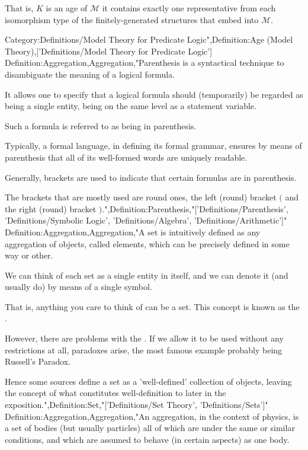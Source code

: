 That is, $K$ is an age of $\mathcal M$  it contains exactly one representative from each isomorphism type of the finitely-generated structures that embed into $\mathcal M$.



Category:Definitions/Model Theory for Predicate Logic",Definition:Age (Model Theory),['Definitions/Model Theory for Predicate Logic']
Definition:Aggregation,Aggregation,"Parenthesis is a syntactical technique to disambiguate the meaning of a logical formula.

It allows one to specify that a logical formula should (temporarily) be regarded as being a single entity, being on the same level as a statement variable.

Such a formula is referred to as being in parenthesis.

Typically, a formal language, in defining its formal grammar, ensures by means of parenthesis that all of its well-formed words are uniquely readable.


Generally, brackets are used to indicate that certain formulas are in parenthesis.

The brackets that are mostly used are round ones, the left (round) bracket $($ and the right (round) bracket $)$.",Definition:Parenthesis,"['Definitions/Parenthesis', 'Definitions/Symbolic Logic', 'Definitions/Algebra', 'Definitions/Arithmetic']"
Definition:Aggregation,Aggregation,"A set is intuitively defined as any aggregation of objects, called elements, which can be precisely defined in some way or other.

We can think of each set as a single entity in itself, and we can denote it (and usually do) by means of a single symbol.


That is, anything you care to think of can be a set. This concept is known as the .


However, there are problems with the . If we allow it to be used without any restrictions at all, paradoxes arise, the most famous example probably being Russell's Paradox.


Hence some sources define a set as a  'well-defined' collection of objects, leaving the concept of what constitutes well-definition to later in the exposition.",Definition:Set,"['Definitions/Set Theory', 'Definitions/Sets']"
Definition:Aggregation,Aggregation,"An aggregation, in the context of physics, is a set of bodies (but usually particles) all of which are under the same or similar conditions, and which are assumed to behave (in certain aspects) as one body.

